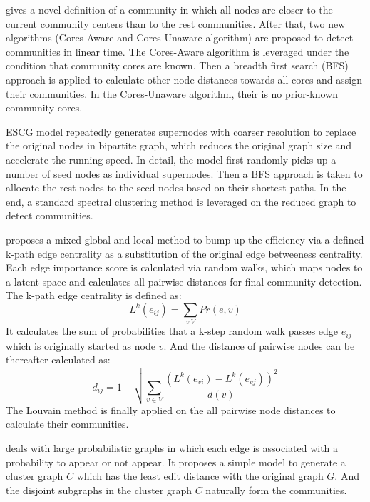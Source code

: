 \cite{li2013efficient} gives a novel definition of a community in which all nodes are closer to the current community centers than to the rest communities. After that, two new algorithms (Cores-Aware and Cores-Unaware algorithm) are proposed to detect communities in linear time. The Cores-Aware algorithm is leveraged under the condition that community cores are known. Then a breadth first search (BFS) approach is applied to calculate other node distances towards all cores and assign their communities. In the Cores-Unaware algorithm, their is no prior-known community cores. 

ESCG model \cite{liu2013large} repeatedly generates supernodes with coarser resolution to replace the original nodes in bipartite graph, which reduces the original graph size and accelerate the running speed. In detail, the model first randomly picks up a number of seed nodes as individual supernodes. Then a BFS approach is taken to allocate the rest nodes to the seed nodes based on their shortest paths. In the end, a standard spectral clustering method is leveraged on the reduced graph to detect communities. 

\cite{de2014mixing} proposes a mixed global and local method to bump up the efficiency via a defined k-path edge centrality as a substitution of the original edge betweeness centrality. Each edge importance score is calculated via random walks, which maps nodes to a latent space and calculates all pairwise distances for final community detection. The k-path edge centrality is defined as:
\begin{equation}
	L^k(e_{ij}) = \sum_{v \ V} Pr(e,v)
\end{equation}
It calculates the sum of probabilities that a k-step random walk passes edge $e_{ij}$ which is originally started as node $v$. And the distance of pairwise nodes can be thereafter calculated as:
\begin{equation}
	d_{ij} = 1 - \sqrt{\sum_{v \in V}\frac{(L^k(e_{vi})-L^k(e_{vj}) )^2}{d(v)}}
\end{equation}
The Louvain method is finally applied on the all pairwise node distances to calculate their communities.

\cite{kollios2013clustering} deals with large probabilistic graphs in which each edge is associated with a probability to appear or not appear. It proposes a simple model to generate a cluster graph $C$ which has the least edit distance with the original graph $G$. And the disjoint subgraphs in the cluster graph $C$ naturally form the communities.

